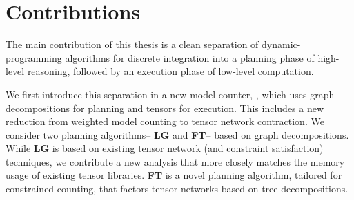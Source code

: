 



\section{Contributions}

The main contribution of this thesis is a clean separation of dynamic-programming algorithms for discrete integration into a planning phase of high-level reasoning, followed by an execution phase of low-level computation.

We first introduce this separation in a new model counter, , which uses graph decompositions for planning and tensors for execution. This includes a new reduction from weighted model counting to tensor network contraction. We consider two planning algorithms-- \textbf{LG} and \textbf{FT}-- based on graph decompositions. While \textbf{LG} is based on existing tensor network (and constraint satisfaction) techniques, we contribute a new analysis that more closely matches the memory usage of existing tensor libraries. \textbf{FT} is a novel planning algorithm, tailored for constrained counting, that factors tensor networks based on tree decompositions.

